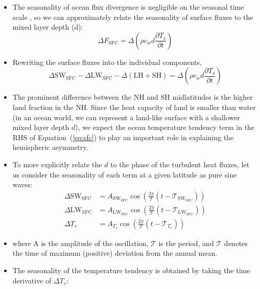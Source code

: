 \documentclass{ametsocV5}
\begin{document}
\begin{itemize}
\begin{equation}
                \end{equation}
          \item The seasonality of ocean flux divergence is negligible on the seasonal time scale \citep{roberts2017}, so we can approximately relate the seasonality of surface fluxes to the mixed layer depth (d):
                \begin{equation}
                  \Delta F_{\mathrm{SFC}} = \Delta\left(\rho c_{w} d \frac{\partial T_{s}}{\partial t}\right)
                \end{equation}
          \item Rewriting the surface fluxes into the individual components,
                \begin{equation} \label{eq:sfc}
                  \Delta \mathrm{SW}_{\mathrm{SFC}} - \Delta\mathrm{LW}_{\mathrm{SFC}} - \Delta(\mathrm{LH + SH}) = \Delta\left(\rho c_{w} d \frac{\partial T_{s}}{\partial t}\right)
                \end{equation}
          \item The prominent difference between the NH and SH midlatitudes is the higher land fraction in the NH. Since the heat capacity of land is smaller than water (in an ocean world, we can represent a land-like surface with a shallower mixed layer depth $d$), we expect the ocean temperature tendency term in the RHS of Equation~(\ref{eq:sfc}) to play an important role in explaining the hemispheric asymmetry.
          \item To more explicitly relate the $d$ to the phase of the turbulent heat fluxes, let us consider the seasonality of each term at a given latitude as pure sine waves:
                \begin{align}
                  \Delta \mathrm{SW}_{\mathrm{SFC}} &= A_{\mathrm{SW_{SFC}}}\cos\left(\frac{2\pi}{\mathcal{T}}(t-\mathscr{T}_{\mathrm{SW_{SFC}}})\right) \\
                  \Delta \mathrm{LW}_{\mathrm{SFC}} &= A_{\mathrm{LW_{SFC}}}\cos\left(\frac{2\pi}{\mathcal{T}}(t-\mathscr{T}_{\mathrm{LW_{SFC}}})\right) \\
                  \Delta T_{s} &= A_{T_{s}}\cos\left(\frac{2\pi}{\mathcal{T}}(t-\mathscr{T}_{T_{s}})\right)
                \end{align}
          \item where A is the amplitude of the oscillation, $\mathcal{T}$ is the period, and $\mathscr{T}$ denotes the time of maximum (positive) deviation from the annual mean.
          \item The seasonality of the temperature tendency is obtained by taking the time derivative of $\Delta T_{s}$:

\end{itemize}
\end{document}
